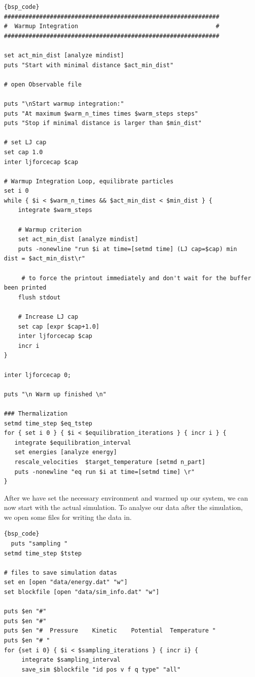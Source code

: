 \documentclass[
paper=a4,                       %
fontsize=11pt,                  %
twoside,                        %
footsepline,                    %
headsepline,                    %
headinclude=false,              %
footinclude=false,              %
pagesize,                       %
]{scrartcl}
\begin{document}
{\small\vspace{0,2cm}
\begin{lstlisting}[firstnumber=auto]{bsp_code}
#############################################################
#  Warmup Integration                                       #
#############################################################

set act_min_dist [analyze mindist]
puts "Start with minimal distance $act_min_dist"

# open Observable file

puts "\nStart warmup integration:"
puts "At maximum $warm_n_times times $warm_steps steps"
puts "Stop if minimal distance is larger than $min_dist"

# set LJ cap
set cap 1.0
inter ljforcecap $cap

# Warmup Integration Loop, equilibrate particles
set i 0
while { $i < $warm_n_times && $act_min_dist < $min_dist } {
    integrate $warm_steps

    # Warmup criterion
    set act_min_dist [analyze mindist]
    puts -nonewline "run $i at time=[setmd time] (LJ cap=$cap) min dist = $act_min_dist\r"
    
     # to force the printout immediately and don't wait for the buffer been printed
    flush stdout

    # Increase LJ cap
    set cap [expr $cap+1.0]
    inter ljforcecap $cap
    incr i
}

inter ljforcecap 0;

puts "\n Warm up finished \n"

### Thermalization 
setmd time_step $eq_tstep
for { set i 0 } { $i < $equilibration_iterations } { incr i } {
   integrate $equilibration_interval
   set energies [analyze energy]
   rescale_velocities  $target_temperature [setmd n_part]
   puts -nonewline "eq run $i at time=[setmd time] \r"
}

\end{lstlisting}}\vspace{0,2cm}

\noindent After we have set the necessary environment and warmed up our system, we can now start with the actual 
simulation. To analyse our data after the simulation, we open some files for writing the data in. 

{\small\vspace{0,2cm}
\begin{lstlisting}[firstnumber=auto]{bsp_code}
  puts "sampling "
setmd time_step $tstep

# files to save simulation datas
set en [open "data/energy.dat" "w"]
set blockfile [open "data/sim_info.dat" "w"]

puts $en "#"
puts $en "#"
puts $en "#  Pressure    Kinetic    Potential  Temperature "
puts $en "# "
for {set i 0} { $i < $sampling_iterations } { incr i} {
     integrate $sampling_interval
     save_sim $blockfile "id pos v f q type" "all"
\end{lstlisting}}\vspace{0,2cm}
\end{document}
